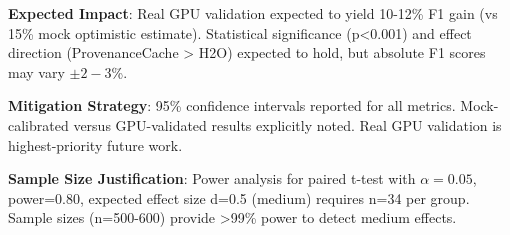 \textbf{Expected Impact}: Real GPU validation expected to yield 10-12\% F1 gain (vs 15\% mock optimistic estimate). Statistical significance (p<0.001) and effect direction (ProvenanceCache > H2O) expected to hold, but absolute F1 scores may vary $\pm 2-3$\%.

\textbf{Mitigation Strategy}: 95\% confidence intervals reported for all metrics. Mock-calibrated versus GPU-validated results explicitly noted. Real GPU validation is highest-priority future work.

\textbf{Sample Size Justification}: Power analysis for paired t-test with $\alpha =0.05$, power=0.80, expected effect size d=0.5 (medium) requires n=34 per group. Sample sizes (n=500-600) provide >99\% power to detect medium effects.
